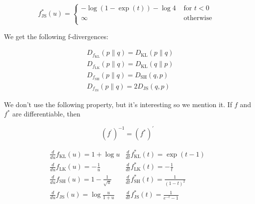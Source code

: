 \documentclass{report}
\begin{document}
\begin{example}
\begin{itemize}
        $$
        f_{\mathrm{JS}}^{*}(u)=
        \begin{cases}
        -\log (1-\exp (t))-\log 4 & \text { for } t < 0 \\
        \infty & \text { otherwise } \\
        \end{cases}
        $$
    \end{itemize}

    We get the following f-divergences:

    $$
    \begin{aligned}
    & D_{f_{\mathrm{KL}}}(p \| q)=D_{\mathrm{KL}}(p \| q) \\
    & D_{f_{\mathrm{LK}}}(p \| q)=D_{\mathrm{KL}}(q \| p) \\
    & D_{f_{\mathrm{SH}}}(p \| q)=D_{\mathrm{SH}}(q, p) \\
    & D_{f_{\mathrm{JS}}}(p \| q)=2 D_{\mathrm{JS}}(q, p)
    \end{aligned}
    $$

    We don't use the following property, but it's interesting so we mention it. If $f$ and $f^{*}$ are differentiable, then

    $$
    \left(f^{\prime}\right)^{-1}=\left(f^{*}\right)^{\prime}
    $$

    $$
    \begin{array}{ll}
    \frac{d}{d u} f_{\mathrm{KL}}(u)=1+\log u & \frac{d}{d t} f_{\mathrm{KL}}^{*}(t)=\exp (t-1) \\
    \frac{d}{d u} f_{\mathrm{LK}}(u)=-\frac{1}{u} & \frac{d}{d t} f_{\mathrm{LK}}^{*}(t)=-\frac{1}{t} \\
    \frac{d}{d u} f_{\mathrm{SH}}(u)=1-\frac{1}{\sqrt{u}} & \frac{d}{d t} f_{\mathrm{SH}}^{*}(t)=\frac{1}{(1-t)^{2}} \\
    \frac{d}{d u} f_{\mathrm{JS}}(u)=\log \frac{u}{1+u} & \frac{d}{d t} f_{\mathrm{JS}}^{*}(t)=\frac{1}{e^{-t}-1}
    \end{array}
    $$
\end{example}
\end{document}
